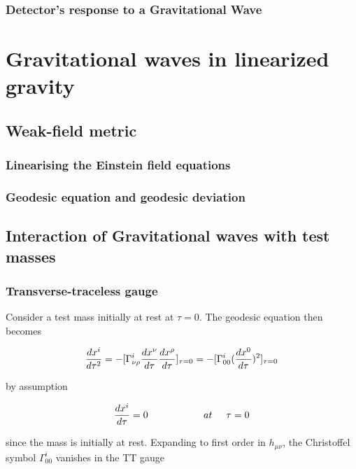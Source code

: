 \documentclass[binding=0.6cm, LaM]{sapthesis}
\begin{document}
\subsection{Detector’s response to a Gravitational Wave}

\chapter{Gravitational waves in linearized gravity}
\section{Weak-field metric}
\subsection{Linearising the Einstein field equations}
\subsection{Geodesic equation and geodesic deviation}
\section{Interaction of Gravitational waves with test masses}

\subsection{Transverse-traceless gauge}

	Consider a test mass initially at rest at $\tau = 0$. The geodesic equation then becomes

		\begin{equation}
		{{dx^i}\over{d\tau^2}} = -[\Gamma^i_{\nu\rho}{{dx^{\nu}}\over{d\tau}}{{dx^{\rho}}\over{d\tau}}]_{\tau=0} \\ 
		= - [ \Gamma^i_{00}({{dx^0}\over{d\tau}})^2]_{\tau=0}
		\end{equation}

	by assumption
		
		\begin{equation}
		{{dx^i}\over{d\tau}} = 0 \hspace*{2cm} at \hspace*{0.5cm}\tau = 0
		\end{equation}

	since the mass is initially at rest. Expanding to first order in $h_{\mu\nu}$, 
	the Christoffel symbol $\Gamma^i_{00}$ vanishes in the TT gauge
\end{document}
